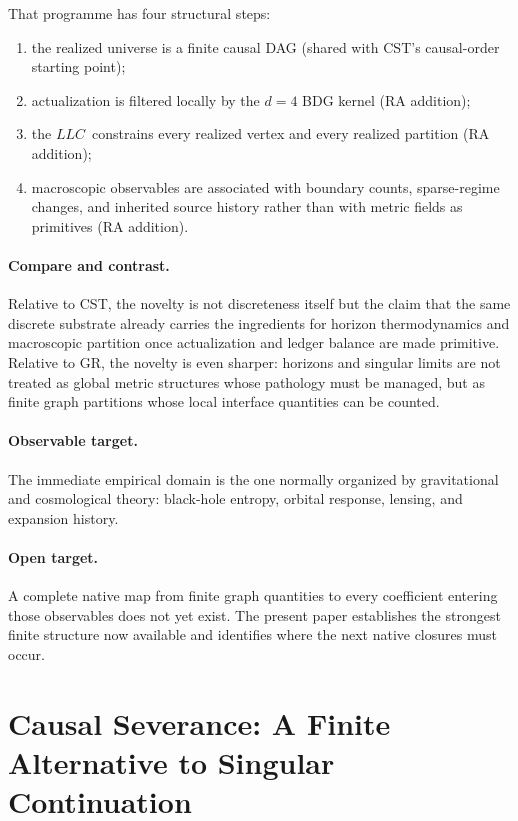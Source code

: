 \documentclass[11pt]{article}
\def\mathrm#1{#1}%
\newcommand{\LLC}{\ensuremath{\mathrm{LLC}}}
\begin{document}
That programme has four structural steps:
\begin{enumerate}[nosep]
    \item the realized universe is a finite causal DAG (shared with CST's causal-order starting point);
    \item actualization is filtered locally by the $d=4$ BDG kernel (RA addition);
    \item the \LLC\ constrains every realized vertex and every realized partition (RA addition);
    \item macroscopic observables are associated with boundary counts, sparse-regime changes, and inherited source history rather than with metric fields as primitives (RA addition).
\end{enumerate}

\paragraph{Compare and contrast.} Relative to CST, the novelty is not discreteness itself but the claim that the same discrete substrate already carries the ingredients for horizon thermodynamics and macroscopic partition once actualization and ledger balance are made primitive. Relative to GR, the novelty is even sharper: horizons and singular limits are not treated as global metric structures whose pathology must be managed, but as finite graph partitions whose local interface quantities can be counted.

\paragraph{Observable target.} The immediate empirical domain is the one normally organized by gravitational and cosmological theory: black-hole entropy, orbital response, lensing, and expansion history.

\paragraph{Open target.} A complete native map from finite graph quantities to every coefficient entering those observables does not yet exist. The present paper establishes the strongest finite structure now available and identifies where the next native closures must occur.

\section{Causal Severance: A Finite Alternative to Singular Continuation}
\label{sec:severance}
\end{document}
